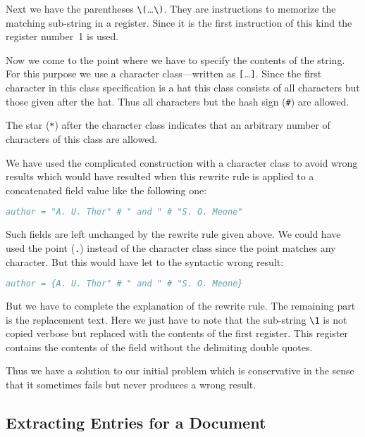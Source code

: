 \documentclass[11pt,a4paper]{scrbook}
\begin{document}
Next we have the parentheses \verb|\(|\ldots\verb|\)|. They are instructions
to memorize the matching sub-string in a register. Since it is the first
instruction of this kind the register number~1 is used.

Now we come to the point where we have to specify the contents of the string.
For this purpose we use a character class---written as \verb|[|\ldots\verb|]|.
Since the first character in this class specification is a hat this class
consists of all characters but those given after the hat. Thus all characters
but the hash sign (\verb|#|\index{\#}) are allowed.

The star (\verb|*|\index{*}) after the character class indicates that an
arbitrary number of characters of this class are allowed.

We have used the complicated construction with a character class to avoid
wrong results which would have resulted when this rewrite rule is applied to a
concatenated field value like the following one:

\begin{lstlisting}[language=BibTeX]
  author = "A. U. Thor" # " and " # "S. O. Meone"
\end{lstlisting}

Such fields are left unchanged by the rewrite rule given above. We could have
used the point (\verb|.|) instead of the character class since the point
matches any character. But this would have let to the syntactic wrong result:
\begin{lstlisting}[language=BibTeX]
  author = {A. U. Thor" # " and " # "S. O. Meone}
\end{lstlisting}

But we have to complete the explanation of the rewrite rule. The remaining
part is the replacement text. Here we just have to note that the sub-string
\verb|\1| is not copied verbose but replaced with the contents of the first
register. This register contains the contents of the field without the
delimiting double quotes.

Thus we have a solution to our initial problem which is conservative in the
sense that it sometimes fails but never produces a wrong result.


\subsection{Extracting Entries for a Document}\label{sample:extract}
\end{document}
